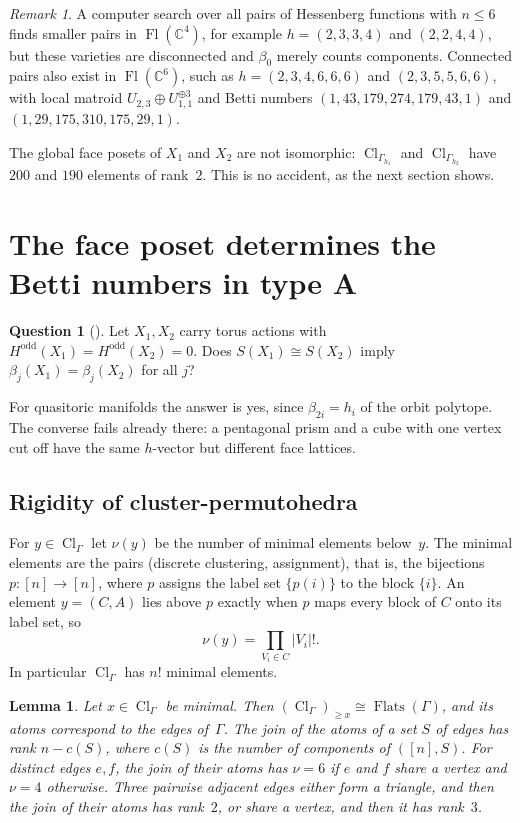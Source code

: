 \documentclass[11pt,a4paper]{article}
\numberwithin{equation}{section}
\theoremstyle{plain}
\newtheorem{lemma}[theorem]{Lemma}
\theoremstyle{definition}
\newtheorem{question}{Question}
\theoremstyle{remark}
\newtheorem{remark}[theorem]{Remark}
\newcommand{\C}{\mathbb{C}}
\DeclareMathOperator{\Fl}{Fl}
\DeclareMathOperator{\Flats}{Flats}
\DeclareMathOperator{\Cl}{Cl}
\begin{document}
\begin{remark}
A computer search over all pairs of Hessenberg functions with $n\leqslant6$ finds smaller pairs in $\Fl(\C^4)$, for example $h=(2,3,3,4)$ and $(2,2,4,4)$, but these varieties are disconnected and $\beta_0$ merely counts components. Connected pairs also exist in $\Fl(\C^6)$, such as $h=(2,3,4,6,6,6)$ and $(2,3,5,5,6,6)$, with local matroid $U_{2,3}\oplus U_{1,1}^{\oplus3}$ and Betti numbers $(1,43,179,274,179,43,1)$ and $(1,29,175,310,175,29,1)$.
\end{remark}

The global face posets of $X_1$ and $X_2$ are not isomorphic: $\Cl_{\Gamma_{h_1}}$ and $\Cl_{\Gamma_{h_2}}$ have $200$ and $190$ elements of rank~$2$. This is no accident, as the next section shows.

\section{The face poset determines the Betti numbers in type A}\label{sec:rigidity}

\begin{question}[\cite{Mik22}]\label{q:betti}
Let $X_1,X_2$ carry torus actions with $H^{\mathrm{odd}}(X_1)=H^{\mathrm{odd}}(X_2)=0$. Does $S(X_1)\cong S(X_2)$ imply $\beta_j(X_1)=\beta_j(X_2)$ for all $j$?
\end{question}

For quasitoric manifolds the answer is yes, since $\beta_{2i}=h_i$ of the orbit polytope. The converse fails already there: a pentagonal prism and a cube with one vertex cut off have the same $h$-vector but different face lattices.

\subsection{Rigidity of cluster-permutohedra}
For $y\in\Cl_\Gamma$ let $\nu(y)$ be the number of minimal elements below~$y$. The minimal elements are the pairs (discrete clustering, assignment), that is, the bijections $p\colon[n]\to[n]$, where $p$ assigns the label set $\{p(i)\}$ to the block $\{i\}$. An element $y=(C,A)$ lies above $p$ exactly when $p$ maps every block of $C$ onto its label set, so
\[
\nu(y)=\prod_{V_i\in C}|V_i|!.
\]
In particular $\Cl_\Gamma$ has $n!$ minimal elements.

\begin{lemma}\label{lem:atoms-nu}
Let $x\in\Cl_\Gamma$ be minimal. Then $(\Cl_\Gamma)_{\geqslant x}\cong\Flats(\Gamma)$, and its atoms correspond to the edges of~$\Gamma$. The join of the atoms of a set $S$ of edges has rank $n-c(S)$, where $c(S)$ is the number of components of $([n],S)$. For distinct edges $e,f$, the join of their atoms has $\nu=6$ if $e$ and $f$ share a vertex and $\nu=4$ otherwise. Three pairwise adjacent edges either form a triangle, and then the join of their atoms has rank~$2$, or share a vertex, and then it has rank~$3$.
\end{lemma}
\end{document}
